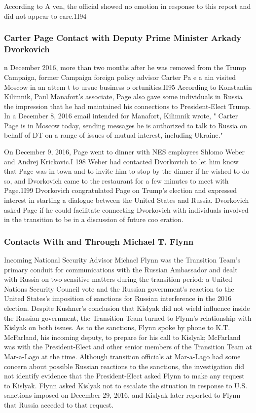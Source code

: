 According to A ven, the official showed no emotion in response to this report and did not appear to care.1I94

\subsubsection{Carter Page Contact with Deputy Prime Minister Arkady Dvorkovich}

n December 2016, more than two months after he was removed from the Trump Campaign, former Campaign foreign policy advisor Carter Pa e a ain visited Moscow in an attem t to ursue business o ortunities.II95 According to Konstantin Kilimnik, Paul Manafort's associate, Page also gave some individuals in Russia the impression that he had maintained his connections to President-Elect Trump. In a December 8, 2016 email intended for Manafort, Kilimnik wrote, " Carter Page is in Moscow today, sending messages he is authorized to talk to Russia on behalf of DT on a range of issues of mutual interest, including Ukraine."%

On December 9, 2016, Page went to dinner with NES employees Shlomo Weber and Andrej Krickovic.I 198 Weber had contacted Dvorkovich to let him know that Page was in town and to invite him to stop by the dinner if he wished to do so, and Dvorkovich came to the restaurant for a few minutes to meet with Page.1I99 Dvorkovich congratulated Page on Trump's election and expressed interest in starting a dialogue between the United States and Russia.%
Dvorkovich asked Page if he could facilitate connecting Dvorkovich with individuals involved in the transition to be in a discussion of future coo eration.%

\subsubsection{Contacts With and Through Michael T. Flynn}

Incoming National Security Advisor Michael Flynn was the Transition Team's primary conduit for communications with the Russian Ambassador and dealt with Russia on two sensitive matters during the transition period: a United Nations Security Council vote and the Russian government's reaction to the United States's imposition of sanctions for Russian interference in the 2016 election.%
Despite Kushner's conclusion that Kislyak did not wield influence inside the Russian government, the Transition Team turned to Flynn's relationship with Kislyak on both issues. As to the sanctions, Flynn spoke by phone to K.T. McFarland, his incoming deputy, to prepare for his call to Kislyak; McFarland was with the President-Elect and other senior members of the Transition Team at Mar-a-Lago at the time. Although transition officials at Mar-a-Lago had some concern about possible Russian reactions to the sanctions, the investigation did not identify evidence that the President-Elect asked Flynn to make any request to Kislyak. Flynn asked Kislyak not to escalate the situation in response to U.S. sanctions imposed on December 29, 2016, and Kislyak later reported to Flynn that Russia acceded to that request.

